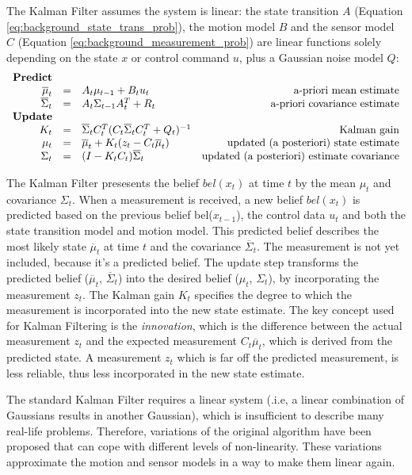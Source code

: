 The Kalman Filter assumes the system is linear: the state transition $A$ (Equation \ref{eq:background_state_trans_prob}), the motion model $B$ and the sensor model $C$ (Equation \ref{eq:background_measurement_prob}) are linear functions solely depending on the state $x$ or control command $u$, plus a Gaussian noise model $Q$:
\begin{equation}
\label{eq:KF}
\begin{array}{rclr}
\text{\textbf{Predict}} \\
\overline{\mu}_t & = & A_t \mu_{t-1} + B_t u_t  & \text{a-priori mean estimate} \\
\overline{\Sigma}_t & = & A_t \Sigma_{t-1} A_t^T + R_t  & \text{a-priori covariance estimate} \\
\text{\textbf{Update}} \\
K_t & = & \overline{\Sigma}_t C_t^T (C_t \overline{\Sigma}_t C_t^T + Q_t)^{-1} & \text{Kalman gain} \\
\mu_t & = & \overline{\mu}_t + K_t(z_t - C_t \overline{\mu}_t) & \text{updated (a posteriori) state estimate} \\
\Sigma_t & = & (I - K_t C_t) \overline{\Sigma}_t & \text{updated (a posteriori) estimate covariance}
\end{array}
\end{equation}

The Kalman Filter presesents the belief $bel(x_t)$ at time $t$ by the mean $\mu_t$ and covariance $\Sigma_t$.
When a measurement is received, a new belief $bel(x_t)$ is predicted based on the previous belief bel($x_{t-1}$), the control data $u_t$ and both the state transition model and motion model.
This predicted belief describes the most likely state $\overline{\mu}_t$ at time $t$ and the covariance $\overline{\Sigma}_t$.
The measurement is not yet included, because it's a predicted belief.
The update step transforms the predicted belief ($\overline{\mu}_t$, $\overline{\Sigma}_t$) into the desired belief ($\mu_t$, $\Sigma_t$), by incorporating the measurement $z_t$.
The Kalman gain $K_t$ specifies the degree to which the measurement is incorporated into the new state estimate.
The key concept used for Kalman Filtering is the \textit{innovation}, which is the difference between the actual measurement $z_t$ and the expected measurement $C_t \overline{\mu}_t$, which is derived from the predicted state.
A measurement $z_t$ which is far off the predicted measurement, is less reliable, thus less incorporated in the new state estimate.

The standard Kalman Filter requires a linear system (.i.e, a linear combination of Gaussians results in another Gaussian), which is insufficient to describe many real-life problems.
Therefore, variations of the original algorithm have been proposed that can cope with different levels of non-linearity.
These variations approximate the motion and sensor models in a way to make them linear again.


